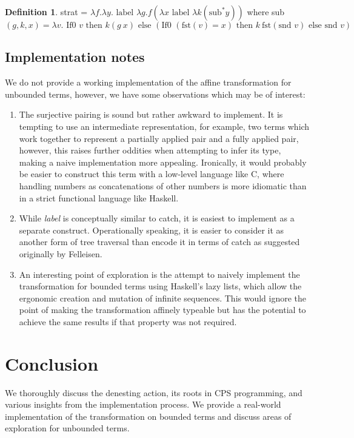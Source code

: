 \documentclass[12pt,a4paper]{report}
\theoremstyle{definition}
\newtheorem{definition}{Definition}[chapter]%
\theoremstyle{remark}
\begin{document}
\begin{definition}
    strat = $\lambda f. \lambda y. \text{ label }\lambda g.f(\lambda x \text{ label } \lambda k (\text{sub}^* y))$ where sub$(g, k, x) = \lambda v. \text{ If0 } v \text{ then } k(g\ x) \text{ else } (\text{If0 } (\text{fst}(v) = x) \text{ then } k\ \text{fst}(\text{snd } v) \text{ else snd } v )$
\end{definition}

\subsection{Implementation notes}
We do not provide a working implementation of the affine transformation for unbounded terms, however, we have some observations which may be of interest:  

\begin{enumerate}
    \item The surjective pairing is sound but rather awkward to implement. It is tempting to use an intermediate representation, for example, two terms which work together to represent a partially applied pair and a fully applied pair, however, this raises further oddities when attempting to infer its type, making a naive implementation more appealing. Ironically, it would probably be easier to construct this term with a low-level language like C, where handling numbers as concatenations of other numbers is more idiomatic than in a strict functional language like Haskell.
    
    \item While \emph{label} is conceptually similar to catch, it is easiest to implement as a separate construct. Operationally speaking, it is easier to consider it as another form of tree traversal than encode it in terms of catch as suggested originally by Felleisen.

    \item An interesting point of exploration is the attempt to naively implement the transformation for bounded terms using Haskell's lazy lists, which allow the ergonomic creation and mutation of infinite sequences. This would ignore the point of making the transformation affinely typeable but has the potential to achieve the same results if that property was not required. 
\end{enumerate}

\section{Conclusion}
We thoroughly discuss the denesting action, its roots in CPS programming, and various insights from the implementation process. We provide a real-world implementation of the transformation on bounded terms and discuss areas of exploration for unbounded terms.
\end{document}
